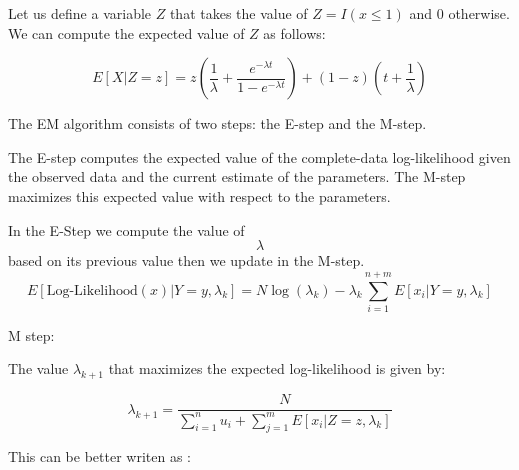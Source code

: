 \documentclass[
]{article}
\begin{document}
Let us define a variable \(Z\) that takes the value of
\(Z = I(x \leq 1)\) and 0 otherwise. We can compute the expected value
of \(Z\) as follows:

\[E[X | Z = z] =   z\left( \frac{1}{\lambda} + \frac{e^{-\lambda t}}{1 - e^{-\lambda t}} \right) + (1-z)(t + \frac{1}{\lambda}) \]

The EM algorithm consists of two steps: the E-step and the M-step.

The E-step computes the expected value of the complete-data
log-likelihood given the observed data and the current estimate of the
parameters. The M-step maximizes this expected value with respect to the
parameters.

In the E-Step we compute the value of \[ \lambda \] based on its
previous value then we update in the M-step.
\[ E[\text{Log-Likelihood}(x)|Y = y,\lambda_{k}] =  N\log(\lambda_{k}) - \lambda_{k} \sum_{i=1}^{n+m}E[x_{i}| Y = y,\lambda_{k}] \]

M step:

The value \(\lambda_{k+1}\) that maximizes the expected log-likelihood
is given by:

\[ \lambda_{k+1} = \frac{N}{\sum_{i=1}^{n}u_{i} + \sum_{j=1}^{m}E[x_{i}|Z = z,\lambda_{k}]} \]

This can be better writen as :
\end{document}
